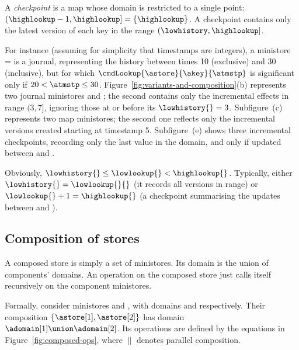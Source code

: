A \emph{checkpoint} is a map whose domain is restricted to a single
point: $(\highlookup-1, \highlookup] = \{ \highlookup \}$.
A checkpoint contains only the latest version of
each key in the range $(\lowhistory, \highlookup]$.

For instance (assuming for simplicity that timestamps are integers), a
ministore \astore{}= is a journal,
representing the history between times 10 (exclusive) and 30
(inclusive), but for which $\cmdLookup{\astore}{\akey}{\atmstp}$ is
significant only if $20 < \atmstp \le 30$.
Figure~\ref{fig:variants-and-composition}(b) represents two journal
ministores  and ;
the second contains only the incremental effects in range $(3,7]$,
ignoring those at or before its $\lowhistory{}=3$.
Subfigure~(c) represents two map ministores; the second one reflects
only the incremental versions created starting at timestamp 5.
Subfigure~(e) shows three incremental checkpoints, recording only
the last value in the domain, and only if updated between \lowhistory{}
and \highlookup{}.

Obviously, $\lowhistory{} \le \lowlookup{} < \highlookup{}$.
Typically, either $\lowhistory{} = \lowlookup{}{}$ (it records all
versions in range) or $\lowlookup{}+1 = \highlookup{}$ (a checkpoint
summarising the updates between \lowhistory{} and \highlookup{}).

\subsection{Composition of stores}
\label{sec:store-composition}

A composed store is simply a set of ministores.
Its domain is the union of components' domains.
An operation on the composed store just calls itself recursively on the
component ministores.

Formally, consider ministores \astore[1] and \astore[2], with domains
\adomain[1] and \adomain[2] respectively.
Their composition $\{ \astore[1], \astore[2] \}$ has domain $\adomain[1]
\union \adomain[2]$.
Its operations are defined by the equations in
Figure~\ref{fig:composed-ops}, where $\parallel$ denotes parallel
composition.

